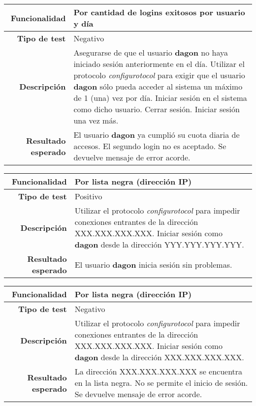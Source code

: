 \documentclass[a4paper,10pt]{article}
\begin{document}
\begin{center}
  \begin{tabular}{|r|p{12.5cm}|}
    \hline
    \textbf{Funcionalidad}	&	Por cantidad de logins exitosos por usuario y día\\
    \hline
    \textbf{Tipo de test}	&	Negativo\\
    \hline
    \textbf{Descripción}	&	Asegurarse de que el usuario \textbf{dagon} no haya iniciado sesión
					anteriormente en el día.
					Utilizar el protocolo \textit{configurotocol} para exigir que el usuario
					\textbf{dagon} sólo pueda acceder al sistema un máximo de 1 (una) vez
					por día. Iniciar sesión en el sistema como dicho usuario. Cerrar sesión.
					Iniciar sesión una vez más.\\
    \hline
    \textbf{Resultado esperado}	&	El usuario \textbf{dagon} ya cumplió su cuota diaria de accesos.
					El segundo login no es aceptado. Se devuelve mensaje de error acorde.\\
    \hline   
  \end{tabular}
\end{center}

\begin{center}
  \begin{tabular}{|r|p{12.5cm}|}
    \hline
    \textbf{Funcionalidad}	&	Por lista negra (dirección IP)\\
    \hline
    \textbf{Tipo de test}	&	Positivo\\
    \hline
    \textbf{Descripción}	&	Utilizar el protocolo \textit{configurotocol} para impedir conexiones
					entrantes de la dirección XXX.XXX.XXX.XXX. Iniciar sesión como
					\textbf{dagon} desde la dirección YYY.YYY.YYY.YYY.\\
    \hline
    \textbf{Resultado esperado}	&	El usuario \textbf{dagon} inicia sesión sin problemas.\\
    \hline   
  \end{tabular}
\end{center}

\begin{center}
  \begin{tabular}{|r|p{12.5cm}|}
    \hline
    \textbf{Funcionalidad}	&	Por lista negra (dirección IP)\\
    \hline
    \textbf{Tipo de test}	&	Negativo\\
    \hline
    \textbf{Descripción}	&	Utilizar el protocolo \textit{configurotocol} para impedir conexiones
					entrantes de la dirección XXX.XXX.XXX.XXX. Iniciar sesión como
					\textbf{dagon} desde la dirección XXX.XXX.XXX.XXX.\\
    \hline
    \textbf{Resultado esperado}	&	La dirección XXX.XXX.XXX.XXX se encuentra en la lista negra. No se permite
					el inicio de sesión. Se devuelve mensaje de error acorde.\\
    \hline   
  \end{tabular}
\end{center}
\end{document}
